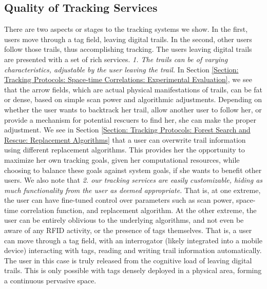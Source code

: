\subsection{Quality of Tracking Services}
There are two aspects or stages to the tracking systems we show. In the first, users move through a tag field, leaving digital trails. In the second, other users follow those trails, thus accomplishing tracking. The users leaving digital trails are presented with a set of rich services. \emph{1. The trails can be of varying characteristics, adjustable by the user leaving the trail.} In Section \ref{Section: Tracking Protocols: Space-time Correlations: Experimental Evaluation}, we see that the arrow fields, which are actual physical manifestations of trails, can be fat or dense, based on simple scan power and algorithmic adjustments. Depending on whether the user wants to backtrack her trail, allow another user to follow her, or provide a mechanism for potential rescuers to find her, she can make the proper adjustment. We see in Section \ref{Section: Tracking Protocols: Forest Search and Rescue: Replacement Algorithms} that a user can overwrite trail information using different replacement algorithms. This provides her the opportunity to maximize her own tracking goals, given her computational resources, while choosing to balance these goals against system goals, if she wants to benefit other users. We also note that \emph{2. our tracking services are easily customizable, hiding as much functionality from the user as deemed appropriate.} That is, at one extreme, the user can have fine-tuned control over parameters such as scan power, space-time correlation function, and replacement algorithm. At the other extreme, the user can be entirely oblivious to the underlying algorithms, and not even be aware of any RFID activity, or the presence of tags themselves. That is, a user can move through a tag field, with an interrogator (likely integrated into a mobile device) interacting with tags, reading and writing trail information automatically. The user in this case is truly released from the cognitive load of leaving digital trails. This is only possible with tags densely deployed in a physical area, forming a continuous pervasive space.

